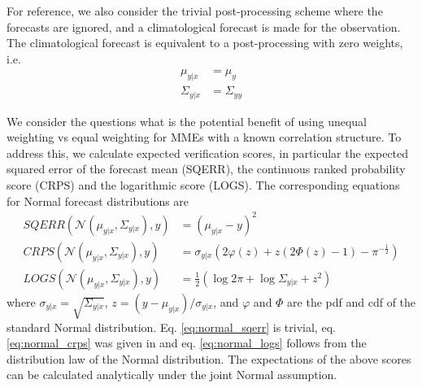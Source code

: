 \documentclass[12pt]{article}
\begin{document}
For reference, we also consider the trivial post-processing scheme where the forecasts are ignored, and a climatological forecast is made for the observation.
The climatological forecast is equivalent to a post-processing with zero weights, i.e.
%
\begin{align}
\mu_{y|x} & = \mu_y\\
\Sigma_{y|x} & = \Sigma_{yy}
\end{align}



We consider the questions what is the potential benefit of using unequal weighting vs equal weighting for MMEs with a known correlation structure.
To address this, we calculate expected verification scores, in particular the expected squared error of the forecast mean (SQERR), the continuous ranked probability score (CRPS) and the logarithmic score (LOGS).
The corresponding equations for Normal forecast distributions are
%
\begin{align}
SQERR(\mathcal{N}(\mu_{y|x},\Sigma_{y|x}),y) & = (\mu_{y|x} - y)^2\label{eq:normal_sqerr}\\
CRPS(\mathcal{N}(\mu_{y|x},\Sigma_{y|x}),y) & = \sigma_{y|x}(2\varphi(z)+z(2\Phi(z)-1)-\pi^{-\frac12})\label{eq:normal_crps}\\
LOGS(\mathcal{N}(\mu_{y|x},\Sigma_{y|x}),y) & = \frac12(\log2\pi + \log\Sigma_{y|x} + z^2)\label{eq:normal_logs}
\end{align}
%
where $\sigma_{y|x} = \sqrt{\Sigma_{y|x}}$, $z=(y - \mu_{y|x})/\sigma_{y|x}$, and $\varphi$ and $\Phi$ are the pdf and cdf of the standard Normal distribution.
Eq. \ref{eq:normal_sqerr} is trivial, eq. \ref{eq:normal_crps} was given in \cite{gneiting2007} and eq. \ref{eq:normal_logs} follows from the distribution law of the Normal distribution.
The expectations of the above scores can be calculated analytically under the joint Normal assumption.
\end{document}
